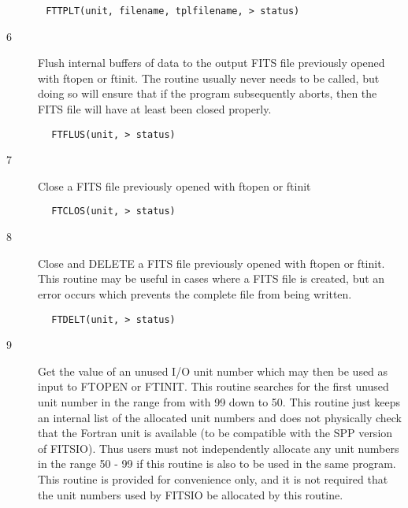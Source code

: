 \documentclass[11pt]{book}
\begin{document}
\begin{verbatim}
       FTTPLT(unit, filename, tplfilename, > status)
\end{verbatim}

\begin{description}
\item[6 ]Flush internal buffers of data to the output FITS file
   previously opened with ftopen or ftinit.  The routine usually
   never needs to be called, but doing so will ensure that
   if the program subsequently aborts, then the FITS file will
  have at least been closed properly.
\end{description}

\begin{verbatim}
        FTFLUS(unit, > status)
\end{verbatim}

\begin{description}
\item[7 ]Close a FITS file previously opened with ftopen or ftinit
\end{description}

\begin{verbatim}
        FTCLOS(unit, > status)
\end{verbatim}

\begin{description}
\item[8 ] Close and DELETE a FITS file previously opened with ftopen or ftinit.
    This routine may be  useful in cases where a FITS file is created, but
   an error occurs which prevents the complete file from being written.
\end{description}

\begin{verbatim}
        FTDELT(unit, > status)
\end{verbatim}

\begin{description}
\item[9 ] Get the value of an unused I/O unit number which may then be used
    as input to FTOPEN or FTINIT.  This routine searches for the first
    unused unit number in the range from with 99 down to 50.   This
    routine just keeps an internal list of the allocated unit numbers
    and does not physically check that the Fortran unit is available (to be
    compatible with the SPP version of FITSIO).  Thus users must not
    independently allocate any unit numbers in the range 50 - 99
    if this routine is also to be used in the same program.  This
    routine is provided for convenience only, and it is not required
   that the unit numbers used by FITSIO be allocated by this routine.
\end{description}
\end{document}
